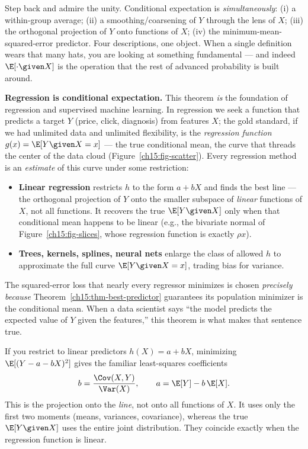 \begin{aestheticbox}
Step back and admire the unity. Conditional expectation is \emph{simultaneously}: (i) a within-group
average; (ii) a smoothing/coarsening of $Y$ through the lens of $X$; (iii) the orthogonal projection of
$Y$ onto functions of $X$; (iv) the minimum-mean-squared-error predictor. Four descriptions, one
object. When a single definition wears that many hats, you are looking at something fundamental --- and
indeed $\E[\cdot \given X]$ is the operation that the rest of advanced probability is built around.
\end{aestheticbox}

\begin{applicationbox}
\textbf{Regression is conditional expectation.} This theorem \emph{is} the foundation of regression and supervised machine learning. In regression we
seek a function that predicts a target $Y$ (price, click, diagnosis) from features $X$; the gold
standard, if we had unlimited data and unlimited flexibility, is the \emph{regression function}
$g(x) = \E[Y\given X = x]$ --- the true conditional mean, the curve that threads the center of the data
cloud (Figure~\ref{ch15:fig-scatter}). Every regression method is an \emph{estimate}
of this curve under some restriction:
\begin{itemize}
  \item \textbf{Linear regression} restricts $h$ to the form $a + bX$ and finds the best line --- the
        orthogonal projection of $Y$ onto the smaller subspace of \emph{linear} functions of $X$, not
        all functions. It recovers the true $\E[Y\given X]$ only when that conditional mean happens to be
        linear (e.g., the bivariate normal of Figure~\ref{ch15:fig-slices}, whose regression function is
        exactly $\rho x$).
  \item \textbf{Trees, kernels, splines, neural nets} enlarge the class of allowed $h$ to approximate
        the full curve $\E[Y\given X = x]$, trading bias for variance.
\end{itemize}
The squared-error loss that nearly every regressor minimizes is chosen \emph{precisely because}
Theorem~\ref{ch15:thm-best-predictor} guarantees its population minimizer is the conditional mean. When
a data scientist says ``the model predicts the expected value of $Y$ given the features,'' this theorem
is what makes that sentence true.
\end{applicationbox}

\begin{remark}
If you restrict to linear predictors $h(X) = a + bX$, minimizing $\E[(Y - a - bX)^2]$ gives the
familiar least-squares coefficients
\[
  b = \frac{\Cov(X,Y)}{\Var(X)}, \qquad a = \E[Y] - b\,\E[X].
\]
This is the projection onto the \emph{line}, not onto all functions of $X$. It uses only the first two
moments (means, variances, covariance), whereas the true $\E[Y\given X]$ uses the entire joint
distribution. They coincide exactly when the regression function is linear.
\end{remark}

